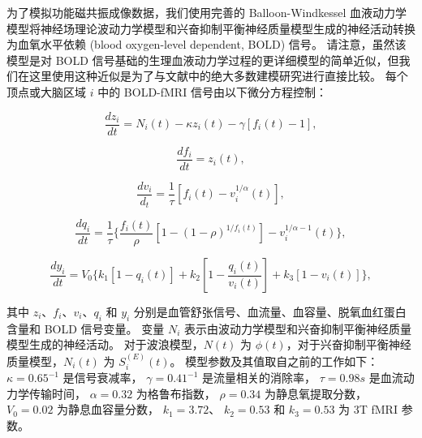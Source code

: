 \documentclass[lang=cn,a4paper,newtx]{elegantpaper}
\begin{document}
为了模拟功能磁共振成像数据，我们使用完善的 Balloon-Windkessel 血液动力学模型将神经场理论波动力学模型和兴奋抑制平衡神经质量模型生成的神经活动转换为血氧水平依赖 (blood oxygen-level dependent, BOLD) 信号\cite{stephan2007comparing}。
请注意，虽然该模型是对 BOLD 信号\cite{aquino2012hemodynamic,pang2017effects,pang2018biophysically}基础的生理血液动力学过程的更详细模型的简单近似，但我们在这里使用这种近似是为了与文献中的绝大多数建模研究进行直接比较\cite{deco2021dynamical,demirtacs2019hierarchical,aquino2022intersection,deco2009key,cabral2014exploring}。
每个顶点或大脑区域 $ i $ 中的 BOLD-fMRI 信号由以下微分方程控制：

\begin{equation}\label{eq:vasodilatory_signal}
	\frac{dz_i}{dt} = N_i (t) - 
					  \kappa z_i(t) - 
					  \gamma [f_i(t) - 1], 
\end{equation}


\begin{equation}\label{eq:blood_inflow}
	\frac{df_i}{dt} = z_i(t),
\end{equation}


\begin{equation}\label{eq:blood_volume}
	\frac{dv_i}{d_t} = \frac{1}{\tau} [f_i(t) - v_i^{1/\alpha} (t)],
\end{equation}


\begin{equation}\label{eq:deoxyhaemoglobin}
	\frac{dq_i}{dt} = \frac{1}{\tau}
					\{
					\frac{f_i(t)}{\rho}
					[1 - (1-\rho)^{1/f_i(t)}]
						- v_i^{1/\alpha - 1} (t)
					\},
\end{equation}


\begin{equation}\label{eq:BOLD_signal}
	\frac{dy_i}{dt} = V_0
					\{
						k_1 [1 - q_i(t)] +
						k_2 [1 - \frac{q_i(t)}{v_i(t)}] + 
						k_3 [1 - v_i(t)]
					\},
\end{equation}


其中 $ z_i $、$ f_i $、$ v_i $、$ q_i $ 和 $ y_i $ 分别是血管舒张信号、血流量、血容量、脱氧血红蛋白含量和 BOLD 信号变量。
变量 $ N_i $ 表示由波动力学模型和兴奋抑制平衡神经质量模型生成的神经活动。
对于波浪模型，$ N(t) $ 为 $ \phi (t) $，对于兴奋抑制平衡神经质量模型，$ N_i (t) $ 为 $ S_i^{(E)} (t) $。
模型参数及其值取自之前的工作\cite{stephan2007comparing,heinzle2016hemodynamic}如下：
$ \kappa = 0.65^{-1} $ 是信号衰减率，
$ \gamma = 0.41^{-1} $ 是流量相关的消除率，
$ \tau = 0.98 s $ 是血流动力学传输时间，
$ \alpha = 0.32 $ 为格鲁布指数，
$ \rho = 0.34 $ 为静息氧提取分数，
$ V_0 = 0.02 $ 为静息血容量分数，
$ k_1 = 3.72 $、
$ k_2 = 0.53 $ 
和 $ k_3 = 0.53 $ 为 3T fMRI 参数。
\end{document}
